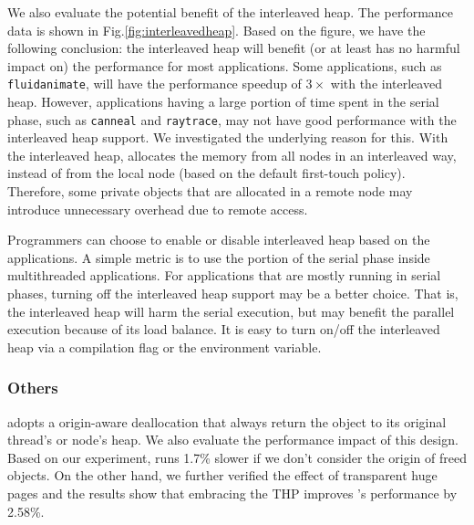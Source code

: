 We also evaluate the potential benefit of the interleaved heap. The performance data is shown in Fig.\ref{fig:interleavedheap}. 
Based on the figure, we have the following conclusion: the interleaved heap will benefit (or at least has no harmful impact on) the performance for most applications. Some applications, such as \texttt{fluidanimate}, will have the performance speedup of $3\times$ with the interleaved heap. However, applications having a large portion of time spent in the serial phase, such as \texttt{canneal} and \texttt{raytrace}, may not have good performance with the interleaved heap support. 
We investigated the underlying reason for this. With the interleaved heap, \NM{} allocates the memory from all nodes in an interleaved way, instead of from the local node (based on the default first-touch policy). Therefore, some private objects that are allocated in a remote node may introduce unnecessary overhead due to remote access. 

Programmers can choose to enable or disable interleaved heap based on the applications. A simple metric is to use the portion of the serial phase inside multithreaded applications. For applications that are mostly running in serial phases, turning off the interleaved heap support may be a better choice. That is, the interleaved heap will harm the serial execution, but may benefit the parallel execution because of its load balance. It is easy to turn on/off the interleaved heap via a compilation flag or the environment variable.  

\subsubsection{Others}

\NM{} adopts a origin-aware deallocation that always return the object to its original thread's or node's heap. We also evaluate the performance impact of this design. Based on our experiment, \NM{} runs 1.7\% slower if we don't consider the origin of freed objects. On the other hand, we further verified the effect of transparent huge pages and the results show that embracing the THP improves \NM{}'s performance by 2.58\%.

